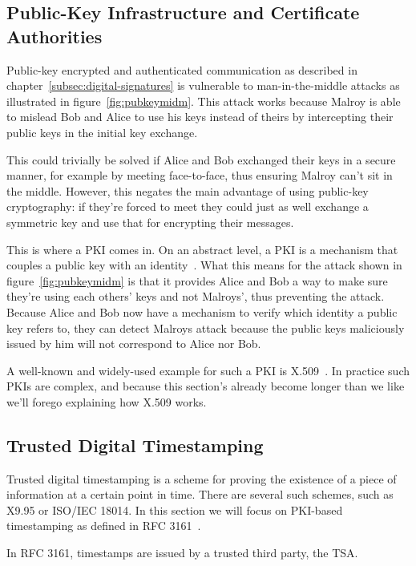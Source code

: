 \subsection{Public-Key Infrastructure and Certificate Authorities}\label{subsec:public-key-infrastructure-and-certificate-authorities}
Public-key encrypted and authenticated communication as described in chapter~\ref{subsec:digital-signatures}
is vulnerable to man-in-the-middle attacks as illustrated in figure~\ref{fig:pubkeymidm}.
This attack works because Malroy is able to mislead Bob and Alice to use his keys instead of theirs
by intercepting their public keys in the initial key exchange.

This could trivially be solved if Alice and Bob exchanged their keys in a secure manner,
for example by meeting face-to-face,
thus ensuring Malroy can't sit in the middle.
However, this negates the main advantage of using public-key cryptography:
if they're forced to meet they could just as well exchange a symmetric key and use that for encrypting
their messages.

This is where a \gls{PKI} comes in.
On an abstract level, a \gls{PKI} is a mechanism that couples a public key with an identity~\cite{whatispki}.
What this means for the attack shown in figure~\ref{fig:pubkeymidm} is that it provides Alice and Bob
a way to make sure they're using each others' keys and not Malroys',
thus preventing the attack.
Because Alice and Bob now have a mechanism to verify which identity a public key refers to,
they can detect Malroys attack because the public keys maliciously issued by him will not correspond to Alice nor Bob.

A well-known and widely-used example for such a \gls{PKI} is X.509~\cite{x509}.
In practice such \gls{PKI}s are complex,
and because this section's already become longer than we like we'll forego explaining how X.509 works.

\subsection{Trusted Digital Timestamping}\label{subsec:timestamps}
Trusted digital timestamping is a scheme for proving the existence of a piece of information at a certain point in time.
There are several such schemes, such as X9.95 or ISO/IEC 18014.
In this section we will focus on \gls{PKI}-based timestamping as defined in RFC 3161~\cite{rfc3161}.

In RFC 3161, timestamps are issued by a trusted third party, the \acrfull{TSA}.


